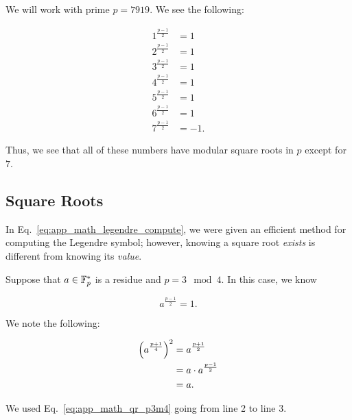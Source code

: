 \begin{example}

We will work with prime $p = 7919$.
We see the following:

\begin{align}
    1^{\frac{p-1}{2}} &= 1
        \nonumber\\
    2^{\frac{p-1}{2}} &= 1
        \nonumber\\
    3^{\frac{p-1}{2}} &= 1
        \nonumber\\
    4^{\frac{p-1}{2}} &= 1
        \nonumber\\
    5^{\frac{p-1}{2}} &= 1
        \nonumber\\
    6^{\frac{p-1}{2}} &= 1
        \nonumber\\
    7^{\frac{p-1}{2}} &= -1.
\end{align}

\noindent
Thus, we see that all of these numbers have modular square roots in $p$
except for $7$.
\end{example}


\subsection{Square Roots}
\label{app:math_finite_fields_sqrt}

In Eq.~\eqref{eq:app_math_legendre_compute}, we were given an efficient
method for computing the Legendre symbol;
however, knowing a square root \emph{exists} is different from knowing
its \emph{value}.

Suppose that $a\in\mathbb{F}_{p}^{*}$ is a residue and $p = 3 \mod 4$.
In this case, we know

\begin{equation}
    a^{\frac{p-1}{2}} = 1.
    \label{eq:app_math_qr_p3m4}
\end{equation}

\noindent
We note the following:

\begin{align}
    \left( a^{\frac{p+1}{4}} \right)^{2} &= a^{\frac{p+1}{2}}
        \nonumber\\
    &= a\cdot a^{\frac{p-1}{2}}
        \nonumber\\
    &= a.
\end{align}

\noindent
We used Eq.~\eqref{eq:app_math_qr_p3m4} going from line 2 to line 3.

